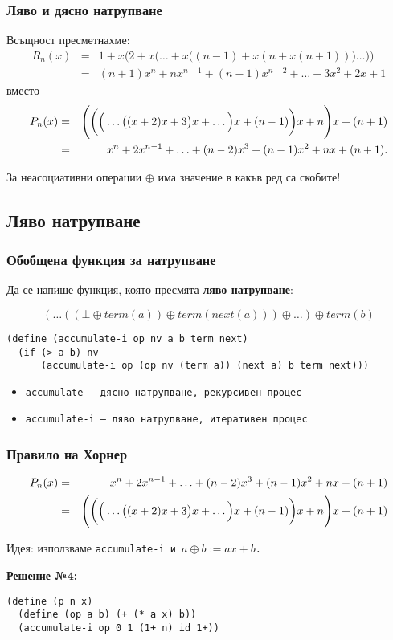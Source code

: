\documentclass{beamer}
\begin{document}
\begin{frame}
  \frametitle{Ляво и дясно натрупване}

  Всъщност пресметнахме:
  \begin{eqnarray*}
    R_n(x) &=& 1+x\bigg(2+x\Big(\ldots+x\Big((n-1)+x(n+x(n+1))\Big)\ldots\Big)\bigg)\\
          &=&  (n+1)x^n + nx^{n-1} + (n-1)x^{n-2} + \ldots + 3x^2 + 2x + 1
  \end{eqnarray*}
  вместо
  \begin{eqnarray*}
    P_n(x) &=& \Bigg(\bigg(\Big(\ldots\big((x + 2)x + 3\big)x + \ldots\Big)x + (n-1)\bigg)x + n\Bigg)x + (n+1)\\
    &=& x^n + 2x^{n-1} + \ldots + (n-2)x^3 + (n-1)x^2 + nx + (n+1).
  \end{eqnarray*}

  \pause

  \alert{За неасоциативни  операции $\oplus$ има значение в какъв ред са скобите!}
\end{frame}

\subsection{Ляво натрупване}

\begin{frame}[fragile]
  \frametitle{Обобщена функция за натрупване}

  Да се напише функция, която пресмята \textbf{ляво натрупване}:

  \begin{equation*}
    (\ldots((\bot \oplus term(a)) \oplus term(next(a))) \oplus \ldots) \oplus term(b)
  \end{equation*}

  \pause
  \small
\begin{verbatim}
(define (accumulate-i op nv a b term next)
  (if (> a b) nv
      (accumulate-i op (op nv (term a)) (next a) b term next)))
\end{verbatim}

  \pause
  \begin{itemize}
  \item \tt{accumulate} --- дясно натрупване, рекурсивен процес
  \item \tt{accumulate-i} --- ляво натрупване, итеративен процес
  \end{itemize}
\end{frame}

\begin{frame}[fragile]
  \frametitle{Правило на Хорнер}

  \begin{eqnarray*}
    P_n(x) &=& x^n + 2x^{n-1} + \ldots + (n-2)x^3 + (n-1)x^2 + nx + (n+1)\\
    &=& \Bigg(\bigg(\Big(\ldots\big((x + 2)x + 3\big)x + \ldots\Big)x + (n-1)\bigg)x + n\Bigg)x + (n+1)
  \end{eqnarray*}

  Идея: използваме \tt{accumulate-i} и $a \oplus b := ax + b$.
  \vspace{1em}
  \pause

  \textbf{Решение №4:}

\begin{verbatim}
(define (p n x)
  (define (op a b) (+ (* a x) b))
  (accumulate-i op 0 1 (1+ n) id 1+))
\end{verbatim}
\end{frame}
\end{document}
